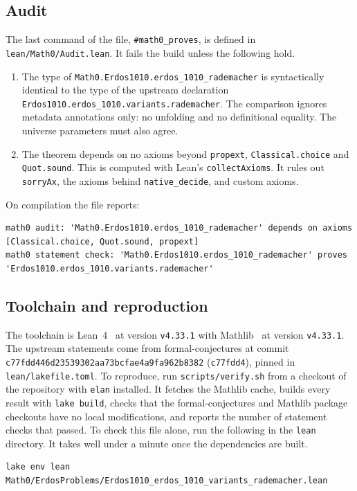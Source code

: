 \documentclass[11pt]{amsart}
\theoremstyle{plain}
\theoremstyle{definition}
\newcommand{\lean}[1]{\texttt{#1}}
\begin{document}
\subsection*{Audit}
The last command of the file, \lean{\#math0\_proves}, is defined in
\nolinkurl{lean/Math0/Audit.lean}. It fails the build unless the following hold.
\begin{enumerate}
\item The type of \lean{Math0.Erdos1010.erdos\_1010\_rademacher} is syntactically identical to the
type of the upstream declaration \lean{Erdos1010.erdos\_1010.variants.rademacher}. The comparison
ignores metadata annotations only: no unfolding and no definitional equality. The universe
parameters must also agree.
\item The theorem depends on no axioms beyond \lean{propext}, \lean{Classical.choice} and
\lean{Quot.sound}. This is computed with Lean's \lean{collectAxioms}. It rules out
\lean{sorryAx}, the axioms behind \lean{native\_decide}, and custom axioms.
\end{enumerate}
On compilation the file reports:
\begin{lstlisting}[language={},basicstyle=\ttfamily\scriptsize]
math0 audit: 'Math0.Erdos1010.erdos_1010_rademacher' depends on axioms [Classical.choice, Quot.sound, propext]
math0 statement check: 'Math0.Erdos1010.erdos_1010_rademacher' proves 'Erdos1010.erdos_1010.variants.rademacher'
\end{lstlisting}

\subsection*{Toolchain and reproduction}
The toolchain is Lean~4~\cite{Lean4} at version \texttt{v4.33.1} with Mathlib~\cite{mathlib} at version \texttt{v4.33.1}. The upstream statements come
from formal-conjectures at commit \texttt{c77fdd446d23539302aa73bcfae4a9fa962b8382}
(\texttt{c77fdd4}), pinned in \nolinkurl{lean/lakefile.toml}. To reproduce, run
\nolinkurl{scripts/verify.sh} from a checkout of the repository with \texttt{elan} installed. It
fetches the Mathlib cache, builds every result with \texttt{lake build}, checks that the
formal-conjectures and Mathlib package checkouts have no local modifications, and reports the
number of statement checks that passed. To check this file alone, run the following in the
\texttt{lean} directory. It takes well under a minute once the dependencies are built.
\begin{lstlisting}[language={}]
lake env lean Math0/ErdosProblems/Erdos1010_erdos_1010_variants_rademacher.lean
\end{lstlisting}
\end{document}
